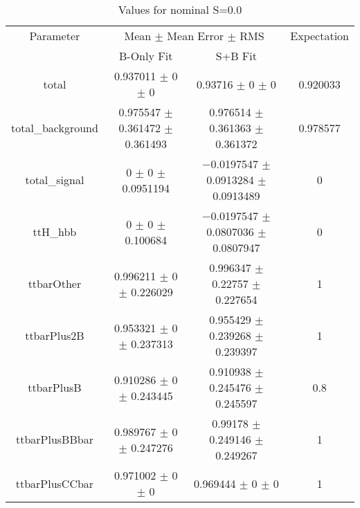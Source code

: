 \begin{table}
\centering
\caption{Values for nominal S=0.0}
\begin{tabular}{cccc}
\toprule
Parameter & \multicolumn{2}{c}{Mean $\pm$ Mean Error $\pm$ RMS} & Expectation\\
 & B-Only Fit & S+B Fit & \\
\midrule
total & \num{0.937011} $\pm$ \num{0} $\pm$ \num{0} & \num{0.93716} $\pm$ \num{0} $\pm$ \num{0} & \num{0.920033}\\
total\_background & \num{0.975547} $\pm$ \num{0.361472} $\pm$ \num{0.361493} & \num{0.976514} $\pm$ \num{0.361363} $\pm$ \num{0.361372} & \num{0.978577}\\
total\_signal & \num{0} $\pm$ \num{0} $\pm$ \num{0.0951194} & \num{-0.0197547} $\pm$ \num{0.0913284} $\pm$ \num{0.0913489} & \num{0}\\
ttH\_hbb & \num{0} $\pm$ \num{0} $\pm$ \num{0.100684} & \num{-0.0197547} $\pm$ \num{0.0807036} $\pm$ \num{0.0807947} & \num{0}\\
ttbarOther & \num{0.996211} $\pm$ \num{0} $\pm$ \num{0.226029} & \num{0.996347} $\pm$ \num{0.22757} $\pm$ \num{0.227654} & \num{1}\\
ttbarPlus2B & \num{0.953321} $\pm$ \num{0} $\pm$ \num{0.237313} & \num{0.955429} $\pm$ \num{0.239268} $\pm$ \num{0.239397} & \num{1}\\
ttbarPlusB & \num{0.910286} $\pm$ \num{0} $\pm$ \num{0.243445} & \num{0.910938} $\pm$ \num{0.245476} $\pm$ \num{0.245597} & \num{0.8}\\
ttbarPlusBBbar & \num{0.989767} $\pm$ \num{0} $\pm$ \num{0.247276} & \num{0.99178} $\pm$ \num{0.249146} $\pm$ \num{0.249267} & \num{1}\\
ttbarPlusCCbar & \num{0.971002} $\pm$ \num{0} $\pm$ \num{0} & \num{0.969444} $\pm$ \num{0} $\pm$ \num{0} & \num{1}\\
\bottomrule
\end{tabular}
\end{table}